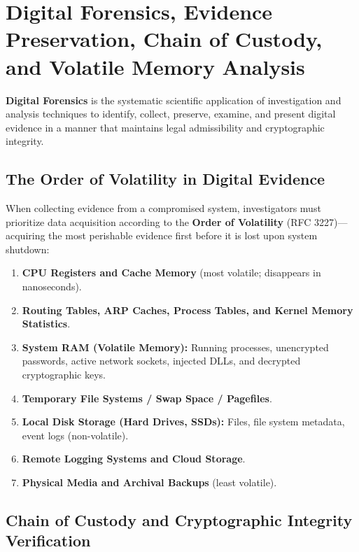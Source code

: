 \newpage
\section{Digital Forensics, Evidence Preservation, Chain of Custody, and Volatile Memory Analysis}

\textbf{Digital Forensics} is the systematic scientific application of investigation and analysis techniques to identify, collect, preserve, examine, and present digital evidence in a manner that maintains legal admissibility and cryptographic integrity.

\subsection{The Order of Volatility in Digital Evidence}

When collecting evidence from a compromised system, investigators must prioritize data acquisition according to the \textbf{Order of Volatility} (RFC 3227)—acquiring the most perishable evidence first before it is lost upon system shutdown:

\begin{enumerate}
\item \textbf{CPU Registers and Cache Memory} (most volatile; disappears in nanoseconds).
\item \textbf{Routing Tables, ARP Caches, Process Tables, and Kernel Memory Statistics}.
\item \textbf{System RAM (Volatile Memory):} Running processes, unencrypted passwords, active network sockets, injected DLLs, and decrypted cryptographic keys.
\item \textbf{Temporary File Systems / Swap Space / Pagefiles}.
\item \textbf{Local Disk Storage (Hard Drives, SSDs):} Files, file system metadata, event logs (non-volatile).
\item \textbf{Remote Logging Systems and Cloud Storage}.
\item \textbf{Physical Media and Archival Backups} (least volatile).
\end{enumerate}

\subsection{Chain of Custody and Cryptographic Integrity Verification}

